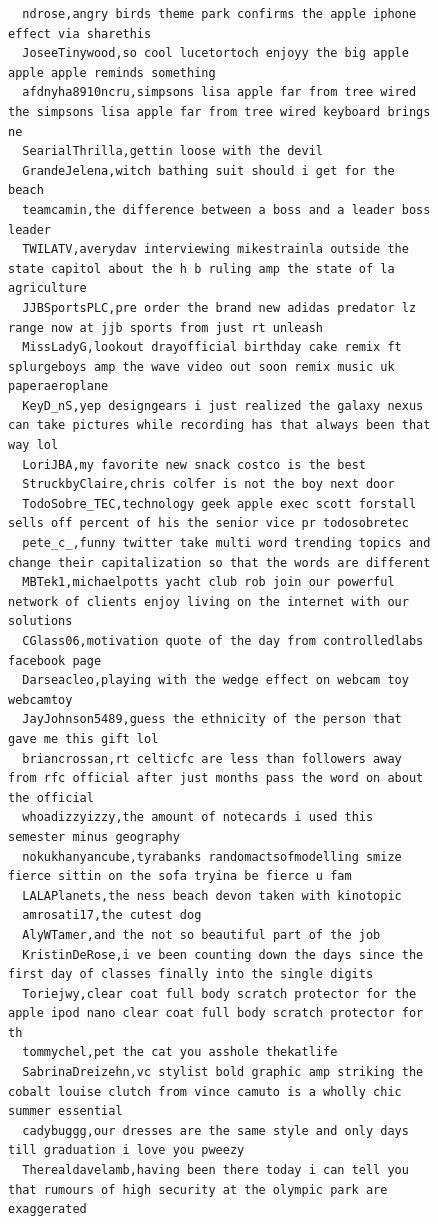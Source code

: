 \begin{figure}[htpb]
\begin{verbatim}
  ndrose,angry birds theme park confirms the apple iphone effect via sharethis
  JoseeTinywood,so cool lucetortoch enjoyy the big apple apple apple reminds something
  afdnyha8910ncru,simpsons lisa apple far from tree wired the simpsons lisa apple far from tree wired keyboard brings ne
  SearialThrilla,gettin loose with the devil
  GrandeJelena,witch bathing suit should i get for the beach
  teamcamin,the difference between a boss and a leader boss leader
  TWILATV,averydav interviewing mikestrainla outside the state capitol about the h b ruling amp the state of la agriculture
  JJBSportsPLC,pre order the brand new adidas predator lz range now at jjb sports from just rt unleash
  MissLadyG,lookout drayofficial birthday cake remix ft splurgeboys amp the wave video out soon remix music uk paperaeroplane
  KeyD_nS,yep designgears i just realized the galaxy nexus can take pictures while recording has that always been that way lol
  LoriJBA,my favorite new snack costco is the best
  StruckbyClaire,chris colfer is not the boy next door
  TodoSobre_TEC,technology geek apple exec scott forstall sells off percent of his the senior vice pr todosobretec
  pete_c_,funny twitter take multi word trending topics and change their capitalization so that the words are different
  MBTek1,michaelpotts yacht club rob join our powerful network of clients enjoy living on the internet with our solutions
  CGlass06,motivation quote of the day from controlledlabs facebook page
  Darseacleo,playing with the wedge effect on webcam toy webcamtoy
  JayJohnson5489,guess the ethnicity of the person that gave me this gift lol
  briancrossan,rt celticfc are less than followers away from rfc official after just months pass the word on about the official
  whoadizzyizzy,the amount of notecards i used this semester minus geography
  nokukhanyancube,tyrabanks randomactsofmodelling smize fierce sittin on the sofa tryina be fierce u fam
  LALAPlanets,the ness beach devon taken with kinotopic
  amrosati17,the cutest dog
  AlyWTamer,and the not so beautiful part of the job
  KristinDeRose,i ve been counting down the days since the first day of classes finally into the single digits
  Toriejwy,clear coat full body scratch protector for the apple ipod nano clear coat full body scratch protector for th
  tommychel,pet the cat you asshole thekatlife
  SabrinaDreizehn,vc stylist bold graphic amp striking the cobalt louise clutch from vince camuto is a wholly chic summer essential
  cadybuggg,our dresses are the same style and only days till graduation i love you pweezy
  Therealdavelamb,having been there today i can tell you that rumours of high security at the olympic park are exaggerated

\end{verbatim}
\end{figure}
